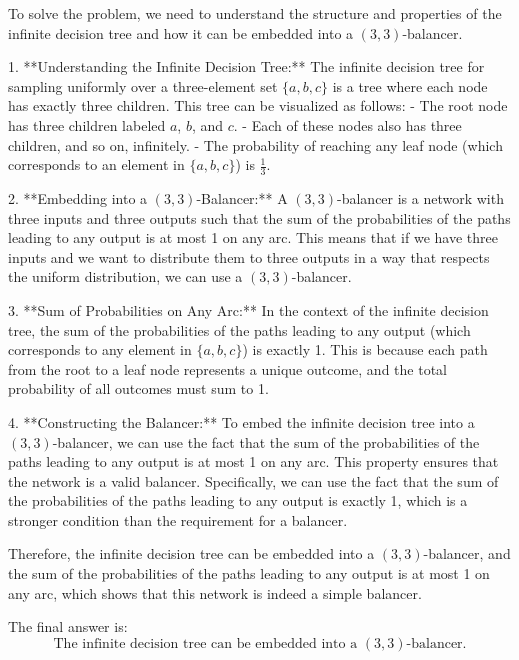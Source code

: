 To solve the problem, we need to understand the structure and properties of the infinite decision tree and how it can be embedded into a \((3,3)\)-balancer.

1. **Understanding the Infinite Decision Tree:**
   The infinite decision tree for sampling uniformly over a three-element set \(\{a, b, c\}\) is a tree where each node has exactly three children. This tree can be visualized as follows:
   - The root node has three children labeled \(a\), \(b\), and \(c\).
   - Each of these nodes also has three children, and so on, infinitely.
   - The probability of reaching any leaf node (which corresponds to an element in \(\{a, b, c\}\)) is \(\frac{1}{3}\).

2. **Embedding into a \((3,3)\)-Balancer:**
   A \((3,3)\)-balancer is a network with three inputs and three outputs such that the sum of the probabilities of the paths leading to any output is at most 1 on any arc. This means that if we have three inputs and we want to distribute them to three outputs in a way that respects the uniform distribution, we can use a \((3,3)\)-balancer.

3. **Sum of Probabilities on Any Arc:**
   In the context of the infinite decision tree, the sum of the probabilities of the paths leading to any output (which corresponds to any element in \(\{a, b, c\}\)) is exactly 1. This is because each path from the root to a leaf node represents a unique outcome, and the total probability of all outcomes must sum to 1.

4. **Constructing the Balancer:**
   To embed the infinite decision tree into a \((3,3)\)-balancer, we can use the fact that the sum of the probabilities of the paths leading to any output is at most 1 on any arc. This property ensures that the network is a valid balancer. Specifically, we can use the fact that the sum of the probabilities of the paths leading to any output is exactly 1, which is a stronger condition than the requirement for a balancer.

Therefore, the infinite decision tree can be embedded into a \((3,3)\)-balancer, and the sum of the probabilities of the paths leading to any output is at most 1 on any arc, which shows that this network is indeed a simple balancer.

The final answer is:
\[
\boxed{\text{The infinite decision tree can be embedded into a } (3,3)\text{-balancer.}}
\]
